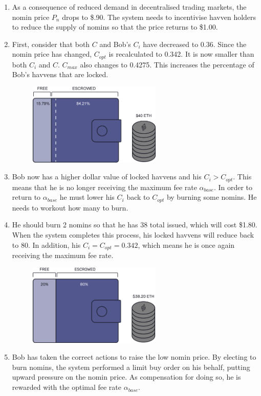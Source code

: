 \begin{enumerate}
\item{As a consequence of reduced demand in decentralised trading markets, the nomin price $P_n$ drops to \$.90. The system needs to incentivise havven holders to reduce the supply of nomins so that the price returns to \$1.00.}
\item{First, consider that both $C$ and Bob's $C_i$ have decreased to 0.36. Since the nomin price has changed, $C_{opt}$ is recalculated to 0.342. It is now smaller than both $C_i$ and $C$. $C_{max}$ also changes to 0.4275. This increases the percentage of Bob's havvens that are locked.}
\begin{figure}[h!]
\centering
    \includegraphics[width=0.6\textwidth]{img/pn_drop}
\end{figure}
\item{Bob now has a higher dollar value of locked havvens and his $C_i > C_{opt}$. This means that he is no longer receiving the maximum fee rate $\alpha_{base}$. In order to return to $\alpha_{base}$ he must lower his $C_i$ back to $C_{opt}$ by burning some nomins. He needs to workout how many to burn.}
\item{He should burn 2 nomins so that he has 38 total issued, which will cost \$1.80. When the system completes this process, his locked havvens will reduce back to 80. In addition, his $C_i = C_{opt} = 0.342 $, which means he is once again receiving the maximum fee rate.}
\begin{figure}[h!]
\centering
    \includegraphics[width=0.6\textwidth]{img/post_burn}
\end{figure}
\item{Bob has taken the correct actions to raise the low nomin price. By electing to burn nomins, the system performed a limit buy order on his behalf, putting upward pressure on the nomin price. As compensation for doing so, he is rewarded with the optimal fee rate $\alpha_{base}$.}
\end{enumerate}

